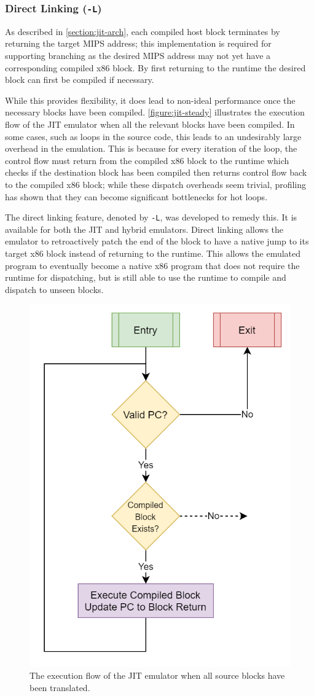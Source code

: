 \subsubsection{Direct Linking (\texttt{-L})}

As described in \autoref{section:jit-arch}, each compiled host block terminates by returning the target MIPS address; this implementation is required for supporting branching as the desired MIPS address may not yet have a corresponding compiled x86 block. By first returning to the runtime the desired block can first be compiled if necessary.

While this provides flexibility, it does lead to non-ideal performance once the necessary blocks have been compiled. \autoref{figure:jit-steady} illustrates the execution flow of the JIT emulator when all the relevant blocks have been compiled. In some cases, such as loops in the source code, this leads to an undesirably large overhead in the emulation. This is because for every iteration of the loop, the control flow must return from the compiled x86 block to the runtime which checks if the destination block has been compiled then returns control flow back to the compiled x86 block; while these dispatch overheads seem trivial, profiling has shown that they can become significant bottlenecks for hot loops.

The direct linking feature, denoted by \texttt{-L}, was developed to remedy this. It is available for both the JIT and hybrid emulators. Direct linking allows the emulator to retroactively patch the end of the block to have a native jump to its target x86 block instead of returning to the runtime. This allows the emulated program to eventually become a native x86 program that does not require the runtime for dispatching, but is still able to use the runtime to compile and dispatch to unseen blocks.

\begin{figure}[h]
    \centering
    \includegraphics[width=0.5\linewidth]{diagrams/jit-steady.png}
    \caption{The execution flow of the JIT emulator when all source blocks have been translated.}
    \label{figure:jit-steady}
\end{figure}

